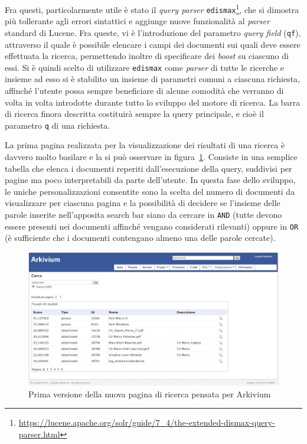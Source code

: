 Fra questi, particolarmente utile è stato il \textit{query parser} \texttt{edismax}\footnote{\url{https://lucene.apache.org/solr/guide/7_4/the-extended-dismax-query-parser.html}}, che si dimostra più tollerante agli errori sintattici e aggiunge nuove funzionalità al \textit{parser} standard di Lucene. Fra queste, vi è l’introduzione del parametro \textit{query field} (\texttt{qf}), attraverso il quale è possibile elencare i campi dei documenti sui quali deve essere effettuata la ricerca, permettendo inoltre di specificare dei \textit{boost} su ciascuno di essi. \newline
Si è quindi scelto di utilizzare \texttt{edismax} come \textit{parser} di tutte le ricerche e insieme ad esso si è stabilito un insieme di parametri comuni a ciascuna richiesta, affinché l’utente possa sempre beneficiare di alcune comodità che verranno di volta in volta introdotte durante tutto lo sviluppo del motore di ricerca. La barra di ricerca finora descritta costituirà sempre la query principale, e cioè il parametro \texttt{q} di una richiesta.

\vspace{1em}

La prima pagina realizzata per la visualizzazione dei risultati di una ricerca è davvero molto basilare e la si può osservare in figura~\ref{fig:gui1}. Consiste in una semplice tabella che elenca i documenti reperiti dall’esecuzione della query, suddivisi per pagine ma poco interpretabili da parte dell’utente. In questa fase dello sviluppo, le uniche personalizzazioni consentite sono la scelta del numero di documenti da visualizzare per ciascuna pagina e la possibilità di decidere se l’insieme delle parole inserite nell’apposita \textit{}{search bar} siano da cercare in \texttt{AND} (tutte devono essere presenti nei documenti affinché vengano considerati rilevanti) oppure in \texttt{OR} (è sufficiente che i documenti contengano almeno una delle parole cercate).

\begin{figure}[H]
	\centering
	\includegraphics[scale=0.50]{../images/03_2_gui_v1}
	\caption[Prima versione della nuova pagina di ricerca pensata per Arkivium]{Prima versione della nuova pagina di ricerca pensata per Arkivium}
	\label{fig:gui1}
\end{figure}

